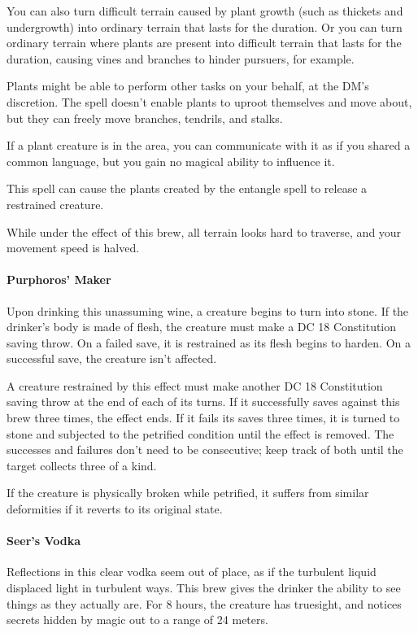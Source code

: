         You can also turn difficult terrain caused by plant growth (such as thickets and undergrowth) into ordinary terrain that lasts for the duration.
        Or you can turn ordinary terrain where plants are present into difficult terrain that lasts for the duration, causing vines and branches to hinder pursuers, for example.

        Plants might be able to perform other tasks on your behalf, at the DM's discretion. The spell doesn't enable plants to uproot themselves and move about, but they can freely move branches, tendrils, and stalks.

        If a plant creature is in the area, you can communicate with it as if you shared a common language, but you gain no magical ability to influence it.

        This spell can cause the plants created by the entangle spell to release a restrained creature.

        While under the effect of this brew, all terrain looks hard to traverse, and your movement speed is halved.
    \paragraph{Purphoros' Maker} %
        Upon drinking this unassuming wine, a creature begins to turn into stone.
        If the drinker's body is made of flesh, the creature must make a DC 18 Constitution saving throw.
        On a failed save, it is restrained as its flesh begins to harden.
        On a successful save, the creature isn't affected.

        A creature restrained by this effect must make another DC 18 Constitution saving throw at the end of each of its turns.
        If it successfully saves against this brew three times, the effect ends.
        If it fails its saves three times, it is turned to stone and subjected to the petrified condition until the effect is removed.
        The successes and failures don't need to be consecutive; keep track of both until the target collects three of a kind.

        If the creature is physically broken while petrified, it suffers from similar deformities if it reverts to its original state.
    \paragraph{Seer's Vodka} %
        Reflections in this clear vodka seem out of place, as if the turbulent liquid displaced light in turbulent ways.
        This brew gives the drinker the ability to see things as they actually are.
        For 8 hours, the creature has truesight, and notices secrets hidden by magic out to a range of 24 meters.
